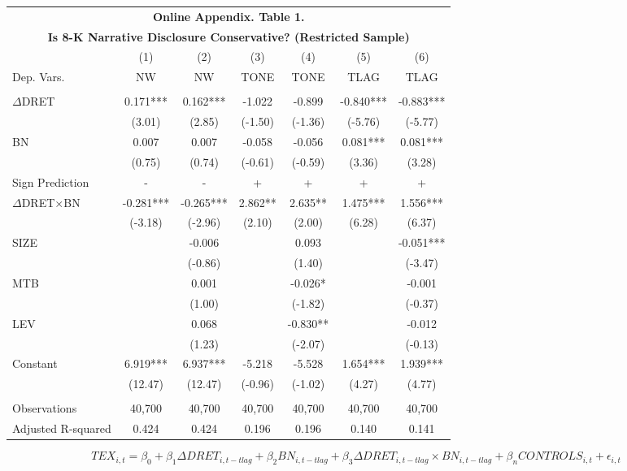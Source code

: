 \begin{table}[H]	\label{oat1}%
	\begin{center}
		\begin{tabular}{lcccccc}
			\multicolumn{7}{c}{\textbf{Online Appendix. Table 1.}} \\
			\multicolumn{7}{c}{\textbf{Is 8-K Narrative Disclosure Conservative? (Restricted Sample)}} \\
			\midrule
			\midrule
			& (1) & (2) & (3) & (4) & (5) & (6) \\
			Dep. Vars. & NW & NW & TONE & TONE & TLAG & TLAG \\
			\midrule
			&   &   &   &   &   &  \\
			$\Delta$DRET & 0.171*** & 0.162*** & -1.022 & -0.899 & -0.840*** & -0.883*** \\
			& (3.01) & (2.85) & (-1.50) & (-1.36) & (-5.76) & (-5.77) \\
			BN & 0.007 & 0.007 & -0.058 & -0.056 & 0.081*** & 0.081*** \\
			& (0.75) & (0.74) & (-0.61) & (-0.59) & (3.36) & (3.28) \\
			\rowcolor[rgb]{ .933,  .925,  .882} Sign Prediction & - & - & + & + & + & + \\
			\rowcolor[rgb]{ .933,  .925,  .882} $\Delta$DRET$\times$BN & -0.281*** & -0.265*** & 2.862** & 2.635** & 1.475*** & 1.556*** \\
			\rowcolor[rgb]{ .933,  .925,  .882}   & (-3.18) & (-2.96) & (2.10) & (2.00) & (6.28) & (6.37) \\
			SIZE &   & -0.006 &   & 0.093 &   & -0.051*** \\
			&   & (-0.86) &   & (1.40) &   & (-3.47) \\
			MTB &   & 0.001 &   & -0.026* &   & -0.001 \\
			&   & (1.00) &   & (-1.82) &   & (-0.37) \\
			LEV &   & 0.068 &   & -0.830** &   & -0.012 \\
			&   & (1.23) &   & (-2.07) &   & (-0.13) \\
			Constant & 6.919*** & 6.937*** & -5.218 & -5.528 & 1.654*** & 1.939*** \\
			& (12.47) & (12.47) & (-0.96) & (-1.02) & (4.27) & (4.77) \\
			&   &   &   &   &   &  \\
			Observations & 40,700 & 40,700 & 40,700 & 40,700 & 40,700 & 40,700 \\
			Adjusted R-squared & 0.424 & 0.424 & 0.196 & 0.196 & 0.140 & 0.141 \\
			\bottomrule
			\bottomrule
		\end{tabular}%
	\end{center}
		\begin{footnotesize}
			\setcounter{equation}{1}
			\begin{equation}
				TEX_{i,t}=\beta_0+\beta_1\Delta DRET_{i,t-tlag}+\beta_2BN_{i,t-tlag}+\beta_3\Delta DRET_{i,t-tlag}\times 	BN_{i,t-tlag}+\beta_nCONTROLS_{i,t}+\epsilon_{i,t}
			\end{equation}
			

\end{footnotesize}
\end{table}
